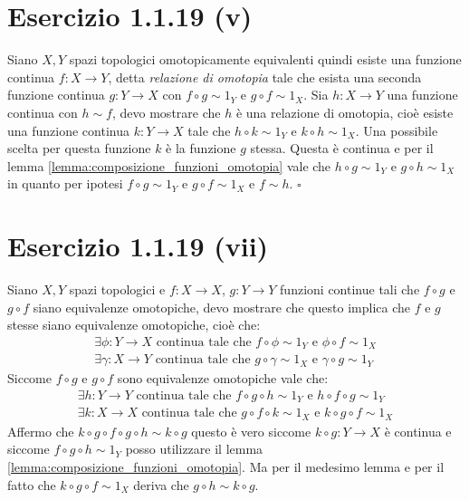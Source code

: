 \documentclass[10pt]{scrartcl}
\begin{document}
\section*{Esercizio 1.1.19 (v)}
Siano $ X, Y $ spazi topologici omotopicamente equivalenti quindi
esiste una funzione continua $ f \colon X \to Y $, detta
\emph{relazione di omotopia} tale che esista una seconda
funzione continua $ g \colon Y \to X $ con $ f \circ g \sim 1_Y $
e $ g \circ f \sim 1_X $. Sia $ h \colon X \to Y $ una funzione
continua con $ h \sim f $, devo mostrare che $ h $ è una
relazione di omotopia, cioè esiste una funzione continua
$ k \colon Y \to X $ tale che $ h \circ k \sim 1_Y $ e $ k \circ h \sim 1_X $.
Una possibile scelta per questa funzione $ k $ è la funzione
$ g $ stessa. Questa è continua e per il lemma \ref{lemma:composizione_funzioni_omotopia}
vale che $ h \circ g \sim 1_Y $ e $ g \circ h \sim 1_X $ in quanto per
ipotesi  $ f \circ g \sim 1_Y $ e $ g \circ f \sim 1_X $ e $ f \sim h $.
\hfill $ \square $

\section*{Esercizio 1.1.19 (vii)}
Siano $ X, Y $ spazi topologici e $ f \colon X \to X $,
$ g \colon Y \to Y $ funzioni continue tali che $ f \circ g $
e $ g \circ f $ siano equivalenze omotopiche, devo mostrare
che questo implica che $ f $ e $ g $ stesse siano
equivalenze omotopiche, cioè che:
\begin{gather*}
  \exists \phi \colon Y \to X \text{ continua tale che } f \circ \phi \sim 1_Y \text{ e } \phi \circ f \sim 1_X \\
  \exists \gamma \colon X \to Y \text{ continua tale che } g \circ \gamma \sim 1_X \text{ e } \gamma \circ g \sim 1_Y
\end{gather*}
Siccome $ f \circ g $ e $ g \circ f $ sono equivalenze omotopiche vale che:
\begin{gather*}
  \exists h \colon Y \to Y  \text{ continua tale che } f \circ g \circ h \sim 1_Y \text{ e } h \circ f \circ g \sim 1_Y \\
  \exists k \colon X \to X  \text{ continua tale che } g \circ f \circ k \sim 1_X \text{ e } k \circ g \circ f \sim 1_X
\end{gather*}
Affermo che $ k \circ g \circ f \circ g \circ h \sim k \circ g $ questo è vero siccome $ k \circ g \colon Y \to X $ è continua
e siccome $ f \circ g \circ h \sim 1_Y $ posso utilizzare il lemma
\ref{lemma:composizione_funzioni_omotopia}. Ma per il medesimo lemma e
per il fatto che $  k \circ g \circ f \sim 1_X $ deriva che $ g \circ h \sim k \circ g $.
\end{document}
